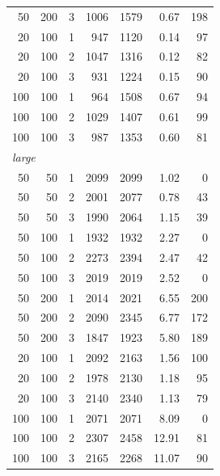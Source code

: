 {\begin{longtable}{r r c r r r r}
50 & 200 & 3 & 1006 & 1579 & 0.67 & 198 \\
20 & 100 & 1 & 947 & 1120 & 0.14 & 97 \\
20 & 100 & 2 & 1047 & 1316 & 0.12 & 82 \\
20 & 100 & 3 & 931 & 1224 & 0.15 & 90 \\
100 & 100 & 1 & 964 & 1508 & 0.67 & 94 \\
100 & 100 & 2 & 1029 & 1407 & 0.61 & 99 \\
100 & 100 & 3 & 987 & 1353 & 0.60 & 81 \\
\midrule
\multicolumn{7}{l}{\textit{large}} \\
50 & 50 & 1 & 2099 & 2099 & 1.02 & 0 \\
50 & 50 & 2 & 2001 & 2077 & 0.78 & 43 \\
50 & 50 & 3 & 1990 & 2064 & 1.15 & 39 \\
50 & 100 & 1 & 1932 & 1932 & 2.27 & 0 \\
50 & 100 & 2 & 2273 & 2394 & 2.47 & 42 \\
50 & 100 & 3 & 2019 & 2019 & 2.52 & 0 \\
50 & 200 & 1 & 2014 & 2021 & 6.55 & 200 \\
50 & 200 & 2 & 2090 & 2345 & 6.77 & 172 \\
50 & 200 & 3 & 1847 & 1923 & 5.80 & 189 \\
20 & 100 & 1 & 2092 & 2163 & 1.56 & 100 \\
20 & 100 & 2 & 1978 & 2130 & 1.18 & 95 \\
20 & 100 & 3 & 2140 & 2340 & 1.13 & 79 \\
100 & 100 & 1 & 2071 & 2071 & 8.09 & 0 \\
100 & 100 & 2 & 2307 & 2458 & 12.91 & 81 \\
100 & 100 & 3 & 2165 & 2268 & 11.07 & 90 \\
\bottomrule
\end{longtable}
}
